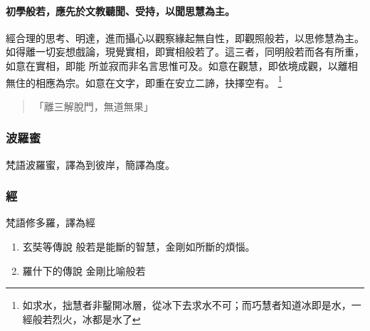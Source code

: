\paragraph{初學般若，應先於文教聽聞、受持，以聞思慧為主。}
經合理的思考、明達，進而攝心以觀察緣起無自性，即觀照般若，以思修慧為主。如得離一切妄想戲論，現覺實相，即實相般若了。這三者，同明般若而各有所重，如意在實相，即能 所並寂而非名言思惟可及。如意在觀慧，即依境成觀，以離相無住的相應為宗。如意在文字，即重在安立二諦，抉擇空有。
\footnote{如求水，拙慧者非鑿開冰層，從冰下去求水不可；而巧慧者知道冰即是水，一經般若烈火，冰都是水了}
\begin{quote}
  「離三解脫門，無道無果」
\end{quote}
\subsubsection{波羅蜜}
梵語波羅蜜，譯為到彼岸，簡譯為度。
\subsubsection{經}
梵語修多羅，譯為經

\begin{enumerate}
  \item 玄奘等傳說 般若是能斷的智慧，金剛如所斷的煩惱。
  \item 羅什下的傳說 金剛比喻般若
\end{enumerate}

